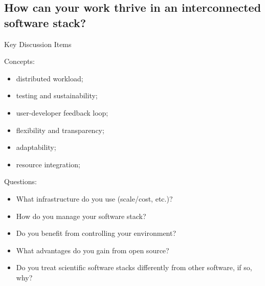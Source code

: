 		\subsection{How can your work thrive in an interconnected software stack?}
			\begin{frame}{Key Discussion Items}
				\begin{minipage}{.35\textwidth}
					Concepts:
					\begin{itemize}
						\item distributed workload;
						\item testing and sustainability;
						\item user-developer feedback loop;
						\item flexibility and transparency;
						\item adaptability;
						\item resource integration;
					\end{itemize}
				\end{minipage}
				\begin{minipage}{.56\textwidth}
					Questions:
					\begin{itemize}
						\item What infrastructure do you use (scale/cost, etc.)?
						\item How do you manage your software stack?
						\item Do you benefit from controlling your environment?
						\item What advantages do you gain from open source?
						\item Do you treat scientific software stacks differently from other software, if so, why?
					\end{itemize}
				\end{minipage}
			\end{frame}

